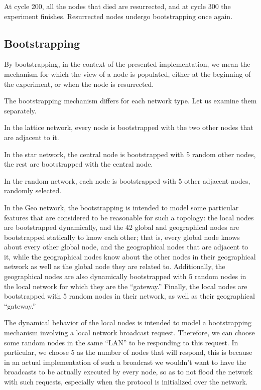 \documentclass[a4paper]{ifacconf}
\begin{document}
At cycle 200, all the nodes that died are resurrected, and at cycle 300 the experiment finishes.
Resurrected nodes undergo bootstrapping once again.

\subsection{Bootstrapping}

By bootstrapping, in the context of the presented implementation, we mean the mechanism for which the view of a node is populated, either at the beginning of the experiment, or when the node is resurrected.

The bootstrapping mechanism differs for each network type.
Let us examine them separately.

In the lattice network, every node is bootstrapped with the two other nodes that are adjacent to it.

In the star network, the central node is bootstrapped with 5 random other nodes, the rest are bootstrapped with the central node.

In the random network, each node is bootstrapped with 5 other adjacent nodes, randomly selected.

In the Geo network, the bootstrapping is intended to model some particular features that are considered to be reasonable for such a topology: the local nodes are bootstrapped dynamically, and the 42 global and geographical nodes are bootstrapped statically to know each other; that is, every global node knows about every other global node, and the geographical nodes that are adjacent to it, while the geographical nodes know about the other nodes in their geographical network as well as the global node they are related to.
Additionally, the geographical nodes are also dynamically bootstrapped with 5 random nodes in the local network for which they are the ``gateway.''
Finally, the local nodes are bootstrapped with 5 random nodes in their network, as well as their geographical ``gateway.''

The dynamical behavior of the local nodes is intended to model a bootstrapping mechanism involving a local network broadcast request.
Therefore, we can choose some random nodes in the same ``LAN'' to be responding to this request.
In particular, we choose 5 as the number of nodes that will respond, this is because in an actual implementation of such a broadcast we wouldn't want to have the broadcasts to be actually executed by every node, so as to not flood the network with such requests, especially when the protocol is initialized over the network.
\end{document}
